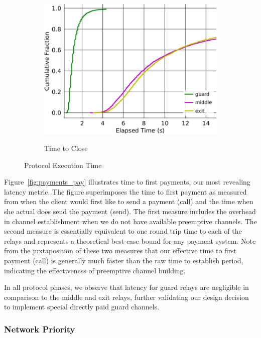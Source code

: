\begin{figure}
\begin{subfigure}[t]{0.32\textwidth}
\includegraphics[trim={0 3cm 0 3cm}, clip, width=1.0\textwidth]{images/payment_close.pdf}
		\label{fig:stats_c}
		\caption{Time to Close}
	\end{subfigure}
	\label{fig:measurements}
	\caption{Protocol Execution Time}
\end{figure}


Figure~\ref{fig:payments_pay} illustrates time to first payments, our most
revealing latency metric. The figure superimposes the time to first payment as
measured from when the client would first like to send a payment (call) and the
time when she actual does send the payment (send). The first measure includes
the overhead in channel establishment when we do not have available preemptive
channels. The second measure is essentially equivalent to one round trip time to
each of the relays and represents a theoretical best-case bound for any payment
system. Note from the juxtaposition of these two measures that our effective
time to first payment (call) is generally much faster than the raw time to
establish period, indicating the effectiveness of preemptive channel building.

In all protocol phases, we observe that latency for guard relays are negligible
in comparison to the middle and exit relays, further validating our design
decision to implement special directly paid guard channels.

\subsubsection{Network Priority}
\label{sec:priority_exp}

